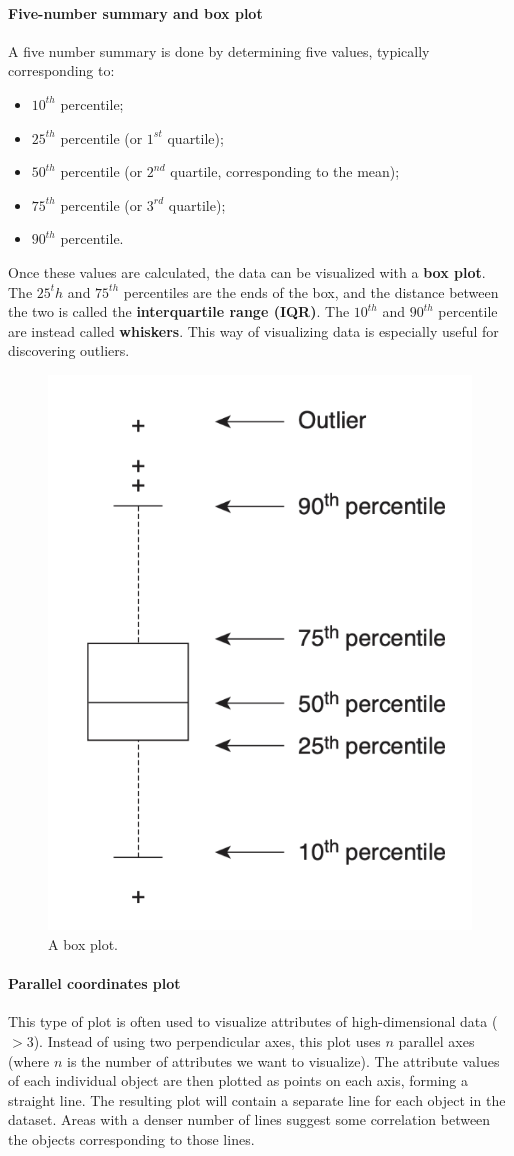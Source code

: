 \paragraph{Five-number summary and box plot}
A five number summary is done by determining five values, typically corresponding to:

\begin{itemize}
    \item $10^{th}$ percentile;
    \item $25^{th}$ percentile (or $1^{st}$ quartile);
    \item $50^{th}$ percentile (or $2^{nd}$ quartile, corresponding to the mean);
    \item $75^{th}$ percentile (or $3^{rd}$ quartile);
    \item $90^{th}$ percentile.
\end{itemize}

Once these values are calculated, the data can be visualized with a \textbf{box plot}. The $25^th$ and $75^{th}$ percentiles are the ends of the box, and the distance between the two is called the \textbf{interquartile range (IQR)}. The $10^{th}$ and $90^{th}$ percentile are instead called \textbf{whiskers}. This way of visualizing data is especially useful for discovering outliers.

\begin{figure}[h]
    \centering
    \includegraphics[width=0.4\linewidth]{img/box plot.png}
    \caption{A box plot.}
\end{figure}

\paragraph{Parallel coordinates plot}
This type of plot is often used to visualize attributes of high-dimensional data ($> 3$). Instead of using two perpendicular axes, this plot uses $n$ parallel axes (where $n$ is the number of attributes we want to visualize). The attribute values of each individual object are then plotted as points on each axis, forming a straight line. The resulting plot will contain a separate line for each object in the dataset. Areas with a denser number of lines suggest some correlation between the objects corresponding to those lines.

